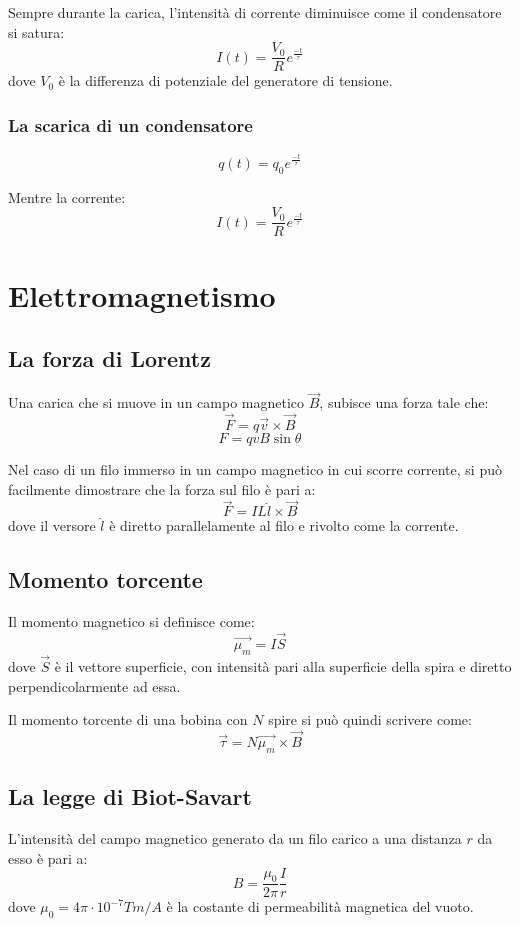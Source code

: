 \documentclass[12pt]{article}
\begin{document}
Sempre durante la carica, l'intensità di corrente diminuisce come il condensatore si satura:
$$ I(t) = \frac{V_0}{R}e^{\frac{-t}{\tau}} $$
dove $V_0$ è la differenza di potenziale del generatore di tensione.

\subsubsection{La scarica di un condensatore}
$$ q(t) = q_0 e^{\frac{-t}{\tau}} $$

Mentre la corrente:
$$ I(t) = \frac{V_0}{R}e^{\frac{-t}{\tau}} $$

\newpage
\section{Elettromagnetismo}

\subsection{La forza di Lorentz}
Una carica che si muove in un campo magnetico $\vec{B}$, subisce una forza tale che:
$$ \vec{F} = q\vec{v}\times \vec{B} $$
$$ F = qvB\sin{\theta} $$

Nel caso di un filo immerso in un campo magnetico in cui scorre corrente, si può facilmente dimostrare che la forza sul filo è pari a:
$$ \vec{F} = IL\hat{l}\times \vec{B} $$
dove il versore $\hat{l}$ è diretto parallelamente al filo e rivolto come la corrente.

\subsection{Momento torcente}
Il momento magnetico si definisce come:
$$ \vec{\mu_m} = I\vec{S} $$
dove $\vec{S}$ è il vettore superficie, con intensità pari alla superficie della spira e diretto perpendicolarmente ad essa.

\vspace{1em}

Il momento torcente di una bobina con $N$ spire si può quindi scrivere come:
$$ \vec{\tau} = N \vec{\mu_m} \times \vec{B} $$

\subsection{La legge di Biot-Savart}
L'intensità del campo magnetico generato da un filo carico a una distanza $r$ da esso è pari a:
$$ B = \frac{\mu_0}{2\pi}\frac{I}{r} $$
dove $\mu_0 = 4\pi \cdot 10^{-7} Tm/A$ è la costante di permeabilità magnetica del vuoto.
\end{document}
